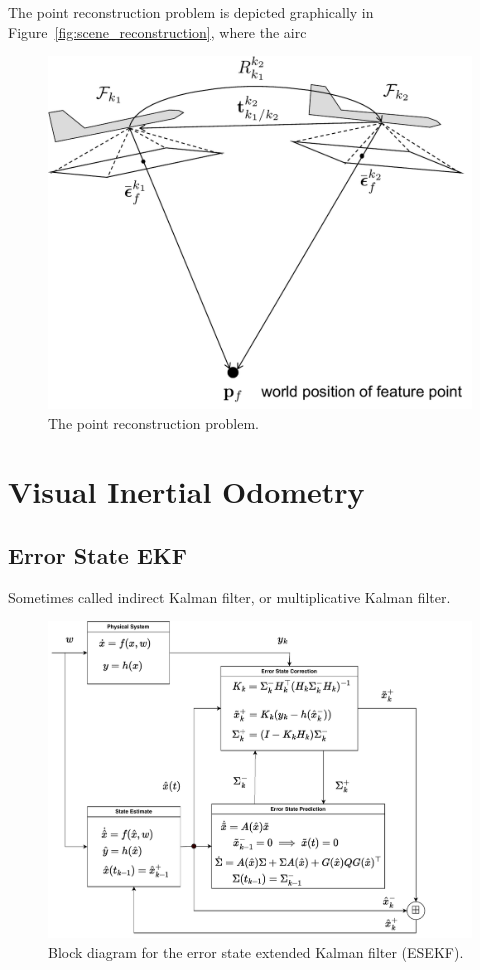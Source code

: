 The point reconstruction problem is depicted graphically in Figure~\ref{fig:scene_reconstruction}, where the airc

\begin{figure}[h]
	\includegraphics[width=0.8\linewidth]{chap8_scene_reconstruction/figures/point_reconstruction}
	\caption{The point reconstruction problem.}
	\label{fig:point_reconstruction}
\end{figure}

\section{Visual Inertial Odometry }
\label{sec:vio}

\subsection{Error State EKF}

Sometimes called indirect Kalman filter, or multiplicative Kalman filter.

\begin{figure}[h]
	\includegraphics[width=0.99\linewidth]{chap8_scene_reconstruction/figures/indirectEKF}
	\caption{Block diagram for the error state extended Kalman filter (ESEKF).}
	\label{fig:indirectEKF}
\end{figure}

